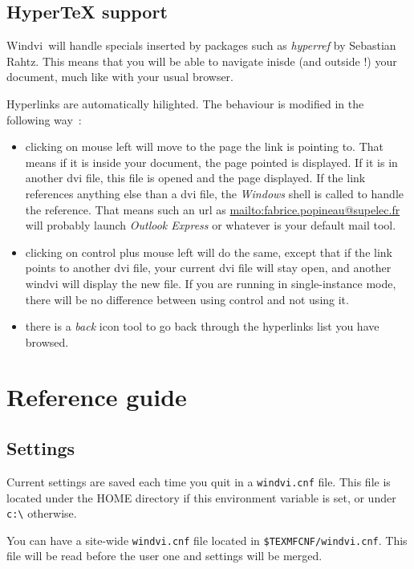 \documentclass[a4paper,11pt]{article}
\def\WDVI{\textsf{Windvi}}
\begin{document}
\subsection{Hyper\TeX{} support}

\WDVI\ will handle specials inserted by packages such as
\emph{hyperref} by Sebastian Rahtz. This means that you will be able
to navigate inisde (and outside !) your document, much like with your
usual browser.

Hyperlinks are automatically hilighted. The behaviour is modified in
the following way~:
\begin{itemize}
\item clicking on mouse left will move to the page the link is
  pointing to. That means if it is inside your document, the page
  pointed is displayed. If it is in another dvi file, this file is
  opened and the page displayed. If the link references anything else
  than a dvi file, the \textsl{Windows} shell is called to handle the
  reference. That means such an url as
  \url{mailto:fabrice.popineau@supelec.fr} will probably launch
  \textsl{Outlook Express} or whatever is your default mail tool.
\item  clicking on control  plus mouse left  will  do the same, except
  that if the  link points to another dvi  file, your current dvi file
  will stay open, and another windvi will display the new file. If you
  are running  in single-instance  mode, there  will be  no difference
  between using control and not using it.
\item there is a \emph{back} icon tool to go back through the
  hyperlinks list you have browsed.
\end{itemize}

\section{Reference guide}

\subsection{Settings}

Current  settings are  saved   each time  you  quit   in a
\texttt{windvi.cnf}  file.  This     file  is  located  under    the
\textsf{HOME} directory  if  this  environment variable  is  set, or
under \verb|c:\| otherwise.
  
You   can have  a  site-wide  \texttt{windvi.cnf}  file
located  in  \texttt{\$TEXMFCNF/windvi.cnf}. This file will  be read
before  the   user   one and   settings will be  merged.  
\end{document}
